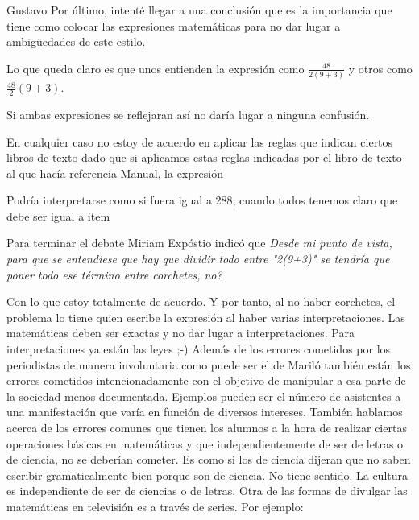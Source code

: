 \begin{opin}{\guscolor}{Gustavo}
Por último, intenté llegar a una conclusión que es la importancia que tiene como colocar las expresiones matemáticas para no dar lugar a ambigüedades de este estilo.


Lo que queda claro es que unos entienden la expresión como $\frac{48}{2(9+3)}$ y otros como $\frac{48}{2}(9+3)$.

Si ambas expresiones se reflejaran así no daría lugar a ninguna confusión.

En cualquier caso no estoy de acuerdo en aplicar las reglas que indican ciertos libros de texto dado que si aplicamos estas reglas indicadas por el libro de texto al que hacía referencia Manual, la expresión 

Podría interpretarse como si fuera igual a 288, cuando todos tenemos claro que debe ser igual a item 

Para terminar el debate Miriam Expóstio indicó que 
\textit{Desde mi punto de vista, para que se entendiese que hay que dividir todo entre "2(9+3)" se tendría que poner todo ese término entre corchetes, no?}


Con lo que estoy totalmente de acuerdo. Y por tanto, al no haber corchetes, el problema lo tiene quien escribe la expresión al haber varias interpretaciones.
Las matemáticas deben ser exactas y no dar lugar a interpretaciones. Para interpretaciones ya están las leyes ;-)
Además de los errores cometidos por los periodistas de manera involuntaria como puede ser el de Mariló también están los errores cometidos intencionadamente con el objetivo de manipular a esa parte de la sociedad menos documentada. Ejemplos pueden ser el número de asistentes a una manifestación que varía en función de diversos intereses.
También hablamos acerca de los errores comunes que tienen los alumnos a la hora de realizar ciertas operaciones básicas en matemáticas y que independientemente de ser de letras o de ciencia, no se deberían cometer. Es como si los de ciencia dijeran que no saben escribir gramaticalmente bien porque son de ciencia. No tiene sentido. La cultura es independiente de ser de ciencias o de letras.
Otra de las formas de divulgar las matemáticas en televisión es a través de series. Por ejemplo:


\end{opin}
